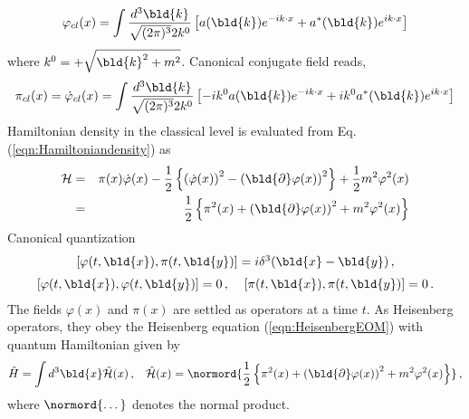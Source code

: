 \begin{equation}
\varphi_{cl}(x) = \int \frac{d^3 \bld{k}}{\sqrt{(2\pi)^3}2k^0} \left[
a(\bld{k}) e^{-i k \cdot x} + a^*(\bld{k})e^{i k \cdot x} \right]
\label{eqn:KGclassicalsol}
\end{equation}
where $k^0 = + \sqrt{\bld{k}^2 + m^2}$. 
Canonical conjugate field reads,
\begin{equation}
\pi_{cl}(x) = \dot{\varphi}_{cl}(x)
=
\int \frac{d^3 \bld{k}}{\sqrt{(2\pi)^3}2k^0}  \left[
- i k^0 a(\bld{k}) e^{-i k \cdot x} + i k^0 a^*(\bld{k})e^{i k \cdot x} \right]
\label{eqn:KGclassicalpi}
\end{equation}
Hamiltonian density in the classical level is evaluated from Eq. (\ref{eqn:Hamiltoniandensity}) as
\begin{eqnarray}
{\cal H} &=& \pi(x) \dot{\varphi}(x) - \frac{1}{2} \left\{
\left( \dot{\varphi}(x) \right)^2 - 
\left( \bld{\partial} \varphi(x) \right)^2 \right\}
+ \frac{1}{2} m^2 \varphi^2(x)
\nonumber\\
&=&
\frac{1}{2} \left\{
\pi^2 (x) + \left( \bld{\partial} \varphi(x) \right)^2 + m^2 \varphi^2(x)
\right\}
\label{eqn:KGHamiltoniandens}
\end{eqnarray}
Canonical quantization
\begin{equation}
\begin{array}{c}
[ \varphi(t,\bld{x}), \pi(t, \bld{y})] = i \delta^3 (\bld{x} - \bld{y} )\,,
\vspace{2mm}
\\
\left[ \varphi(t,\bld{x}), \varphi(t,\bld{y}) \right] = 0\,,
\;\;\;\;\left[ \pi(t,\bld{x}), \pi(t,\bld{y}) \right] = 0\,.
\end{array}
\label{eqn:cancomm_eqtime_RS}
\end{equation}
The fields $\varphi(x)$ and $\pi(x)$ are settled as operators at a time $t$.
As Heisenberg operators,
they obey the Heisenberg equation (\ref{eqn:HeisenbergEOM}) with quantum Hamiltonian
given by
\begin{equation}
\hat{H} = \int d^3 \bld{x} \hat{{\cal H}}(x)\,,
\hspace{3mm}
\hat{{\cal H}}(x) = 
\normord{ \frac{1}{2} \left\{
\pi^2 (x) + \left( \bld{\partial} \varphi(x) \right)^2 + m^2 \varphi^2(x)
\right\}
}\,,
\label{eqn:KG_Hamiltonian}
\end{equation}
where $\normord{\dots}$ denotes the normal product.
